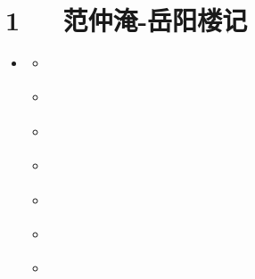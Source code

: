 \documentclass[letterpaper,12pt,english]{sphinxmanual}
\begin{document}
\chapter{1   范仲淹-岳阳楼记}
\label{\detokenize{p01_u6563_u6587/_u8303_u4ef2_u6df9-_u5cb3_u9633_u697c_u8bb0:id1}}\label{\detokenize{p01_u6563_u6587/_u8303_u4ef2_u6df9-_u5cb3_u9633_u697c_u8bb0::doc}}
\begin{sphinxShadowBox}
\begin{itemize}
\item {} 
\label{\detokenize{p01_u6563_u6587/_u8303_u4ef2_u6df9-_u5cb3_u9633_u697c_u8bb0:id10}}{\hyperref[\detokenize{p01_u6563_u6587/_u8303_u4ef2_u6df9-_u5cb3_u9633_u697c_u8bb0:id1}]{}}
\begin{itemize}
\item {} 
\label{\detokenize{p01_u6563_u6587/_u8303_u4ef2_u6df9-_u5cb3_u9633_u697c_u8bb0:id11}}{\hyperref[\detokenize{p01_u6563_u6587/_u8303_u4ef2_u6df9-_u5cb3_u9633_u697c_u8bb0:id3}]{}}

\item {} 
\label{\detokenize{p01_u6563_u6587/_u8303_u4ef2_u6df9-_u5cb3_u9633_u697c_u8bb0:id12}}{\hyperref[\detokenize{p01_u6563_u6587/_u8303_u4ef2_u6df9-_u5cb3_u9633_u697c_u8bb0:id4}]{}}

\item {} 
\label{\detokenize{p01_u6563_u6587/_u8303_u4ef2_u6df9-_u5cb3_u9633_u697c_u8bb0:id13}}{\hyperref[\detokenize{p01_u6563_u6587/_u8303_u4ef2_u6df9-_u5cb3_u9633_u697c_u8bb0:id5}]{}}

\item {} 
\label{\detokenize{p01_u6563_u6587/_u8303_u4ef2_u6df9-_u5cb3_u9633_u697c_u8bb0:id14}}{\hyperref[\detokenize{p01_u6563_u6587/_u8303_u4ef2_u6df9-_u5cb3_u9633_u697c_u8bb0:id6}]{}}

\item {} 
\label{\detokenize{p01_u6563_u6587/_u8303_u4ef2_u6df9-_u5cb3_u9633_u697c_u8bb0:id15}}{\hyperref[\detokenize{p01_u6563_u6587/_u8303_u4ef2_u6df9-_u5cb3_u9633_u697c_u8bb0:id7}]{}}

\item {} 
\label{\detokenize{p01_u6563_u6587/_u8303_u4ef2_u6df9-_u5cb3_u9633_u697c_u8bb0:id16}}{\hyperref[\detokenize{p01_u6563_u6587/_u8303_u4ef2_u6df9-_u5cb3_u9633_u697c_u8bb0:id8}]{}}

\item {} 
\label{\detokenize{p01_u6563_u6587/_u8303_u4ef2_u6df9-_u5cb3_u9633_u697c_u8bb0:id17}}{\hyperref[\detokenize{p01_u6563_u6587/_u8303_u4ef2_u6df9-_u5cb3_u9633_u697c_u8bb0:id9}]{}}

\end{itemize}

\end{itemize}
\end{sphinxShadowBox}
\end{document}
